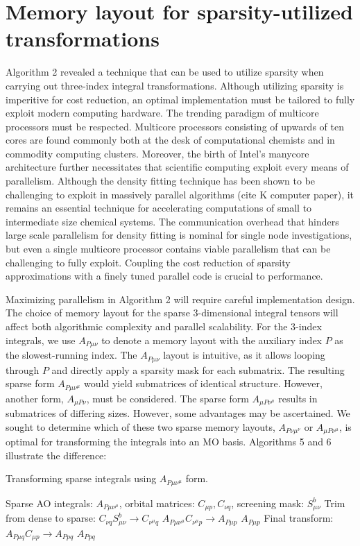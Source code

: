 \section{Memory layout for sparsity-utilized transformations}

Algorithm 2 revealed a technique that can be used to utilize sparsity when carrying out three-index integral transformations.
Although utilizing sparsity is imperitive for cost reduction, an optimal implementation must be tailored to
fully exploit modern computing hardware. The trending paradigm of multicore processors must be respected.
Multicore processors consisting of upwards of ten cores are found commonly both at the desk of computational
chemists and in commodity computing clusters.
Moreover, the birth of Intel's manycore architecture further necessitates that scientific computing
exploit every means of parallelism.
Although the density fitting technique has been shown to be challenging to exploit in massively parallel
algorithms (cite K computer paper), it remains an essential technique for accelerating computations of 
small to intermediate size chemical systems.
The communication overhead that hinders large scale parallelism for density
fitting is nominal for single node investigations, but even a single multicore processor contains viable
parallelism that can be challenging to fully exploit. 
Coupling the cost reduction of sparsity approximations with a finely tuned parallel code is crucial to performance.   

Maximizing parallelism in Algorithm 2 will require careful implementation design. 
The choice of memory layout for the sparse 3-dimensional integral tensors will affect both algorithmic 
complexity and parallel scalability. For the 3-index integrals, we use $A_{P\mu \nu}$ to denote a memory 
layout with the auxiliary index $P$ as the slowest-running index. 
The $A_{P \mu \nu}$ layout is intuitive, as it allows looping through $P$ and directly apply a sparsity mask 
for each submatrix. The resulting sparse form $A_{P \mu \nu^\mu}$ would yield submatrices of identical structure.
However, another form, $A_{\mu P \nu}$, must be considered. The sparse form $A_{\mu P \nu^\mu}$
results in submatrices of differing sizes. However, some advantages may be ascertained.
We sought to determine which of these two sparse memory layouts, $A_{P \nu \mu^\nu}$ or 
$A_{\mu P \nu^\mu}$, is optimal for transforming the integrals into an MO basis.
Algorithms 5 and 6 illustrate the difference:

\begin{algorithm}[H]
\caption{Transforming sparse integrals using $A_{P \mu \nu^\mu}$ form.}
\begin{algorithmic}
\REQUIRE Sparse AO integrals: $A_{P \mu \nu^\mu}$, orbital matrices: $C_{\mu p}, C_{\nu q}$, screening mask: $S_{\mu \nu}^b$
    \STATE Trim from dense to sparse: $C_{\nu q}S_{\mu \nu}^b \rightarrow C_{\nu^{\mu} q}$
    \STATE $A_{P \mu \nu^\mu} C_{\nu^{\mu} p} \rightarrow A_{P \mu p}$
\ENDFOR
\RETURN $A_{P \mu p}$
\STATE Final transform: $A_{P \mu q}C_{\mu p} \rightarrow A_{P p q}$
\RETURN $A_{P p q}$
\end{algorithmic}
\end{algorithm}

